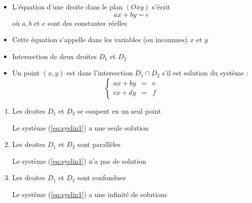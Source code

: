 \begin{frame}
\begin{itemize}
  \item L'équation d'une droite dans le plan $(Oxy)$ s'écrit
$$a x + b y = e$$
où $a, b$ et $e$ sont des constantes réelles
\pause  

  \item Cette équation s'appelle 
 dans les variables 
(ou inconnues) $x$ et $y$


\pause   
  \item Intersection de deux droites $D_1$ et $D_2$

\pause
  
  \item Un point $(x,y)$ est dans l'intersection
$D_1 \cap D_2$ s'il est solution du système : 
\begin{equation}
\left\{\begin{array}{rcl} 
a x + b y & = & e\\
c x + d y & = & f 
\end{array}\right.  
\tag{$S$}  
\label{eq:syslin1}  
\end{equation}
\end{itemize}










\end{frame}

\begin{frame}




\begin{enumerate}
  \item Les droites $D_1$ et $D_2$ se coupent en un seul point

 Le système (\ref{eq:syslin1}) a une seule solution

\pause

  \item Les droites $D_1$ et $D_2$ sont parallèles
  
  Le système  (\ref{eq:syslin1}) n'a pas de solution
 
 \pause

  \item Les droites $D_1$ et $D_2$ sont confondues
  
  Le système  (\ref{eq:syslin1}) a une infinité de solutions 

\end{enumerate}

\end{frame}


